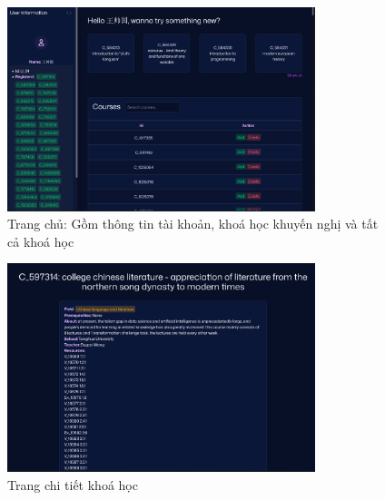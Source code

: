 \begin{figure}[H]
    \centering
    \includegraphics[width=0.8\textwidth]{figures/76.png}
    \caption{Trang chủ: Gồm thông tin tài khoản, khoá học khuyến nghị và tất cả khoá học}
\end{figure}

\begin{figure}[H]
    \centering
    \includegraphics[width=0.8\textwidth]{figures/77.png}
    \caption{Trang chi tiết khoá học}
\end{figure}